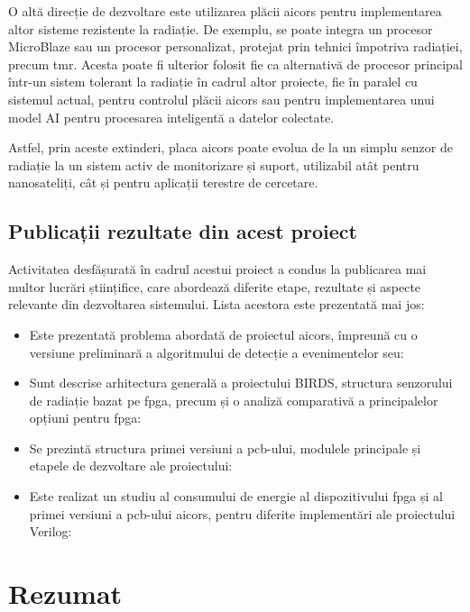 \documentclass[12pt,a4paper]{report}
\begin{document}
O altă direcție de dezvoltare este utilizarea plăcii \gls{aicors} pentru implementarea altor sisteme rezistente la radiație. De exemplu, se poate integra un procesor MicroBlaze sau un procesor personalizat, protejat prin tehnici împotriva radiației, precum \gls{tmr}. Acesta poate fi ulterior folosit fie ca alternativă de procesor principal într-un sistem tolerant la radiație în cadrul altor proiecte, fie în paralel cu sistemul actual, pentru controlul plăcii \gls{aicors} sau pentru implementarea unui model AI pentru procesarea inteligentă a datelor colectate.

Astfel, prin aceste extinderi, placa \gls{aicors} poate evolua de la un simplu senzor de radiație la un sistem activ de monitorizare și suport, utilizabil atât pentru nanosateliți, cât și pentru aplicații terestre de cercetare.

\section{Publicații rezultate din acest proiect}
Activitatea desfășurată în cadrul acestui proiect a condus la publicarea mai multor lucrări științifice, care abordează diferite etape, rezultate și aspecte relevante din dezvoltarea sistemului. Lista acestora este prezentată mai jos:

\begin{itemize}
    \item Este prezentată problema abordată de proiectul \gls{aicors}, împreună cu o versiune preliminară a algoritmului de detecție a evenimentelor \gls{seu}: 
    \item Sunt descrise arhitectura generală a proiectului BIRDS, structura senzorului de radiație bazat pe \gls{fpga}, precum și o analiză comparativă a principalelor opțiuni pentru \gls{fpga}: 
    \item Se prezintă structura primei versiuni a \gls{pcb}-ului, modulele principale și etapele de dezvoltare ale proiectului: 
    \item Este realizat un studiu al consumului de energie al dispozitivului \gls{fpga} și al primei versiuni a \gls{pcb}-ului \gls{aicors}, pentru diferite implementări ale proiectului Verilog: 
\end{itemize}

\printbibliography

\chapter*{Rezumat}
\end{document}

